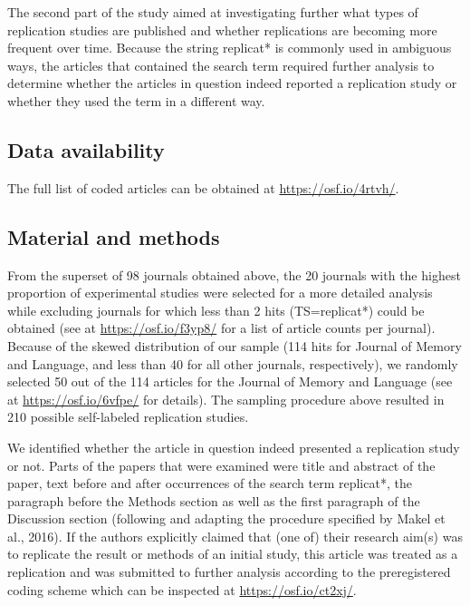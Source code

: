 \documentclass[]{elsarticle} %
\begin{document}
The second part of the study aimed at investigating further what types of replication studies are published and whether replications are becoming more frequent over time.
Because the string replicat* is commonly used in ambiguous ways, the articles that contained the search term required further analysis to determine whether the articles in question indeed reported a replication study or whether they used the term in a different way.

\hypertarget{data-availability-1}{%
\subsection{Data availability}\label{data-availability-1}}

The full list of coded articles can be obtained at \url{https://osf.io/4rtvh/}.

\hypertarget{material-and-methods-1}{%
\subsection{Material and methods}\label{material-and-methods-1}}

From the superset of 98 journals obtained above, the 20 journals with the highest proportion of experimental studies were selected for a more detailed analysis while excluding journals for which less than 2 hits (TS=replicat*) could be obtained (see at \url{https://osf.io/f3yp8/} for a list of article counts per journal).
Because of the skewed distribution of our sample (114 hits for Journal of Memory and Language, and less than 40 for all other journals, respectively), we randomly selected 50 out of the 114 articles for the Journal of Memory and Language (see at \url{https://osf.io/6vfpe/} for details).
The sampling procedure above resulted in 210 possible self-labeled replication studies.

We identified whether the article in question indeed presented a replication study or not.
Parts of the papers that were examined were title and abstract of the paper, text before and after occurrences of the search term replicat*, the paragraph before the Methods section as well as the first paragraph of the Discussion section (following and adapting the procedure specified by Makel et al., 2016).
If the authors explicitly claimed that (one of) their research aim(s) was to replicate the result or methods of an initial study, this article was treated as a replication and was submitted to further analysis according to the preregistered coding scheme which can be inspected at \url{https://osf.io/ct2xj/}.
\end{document}
